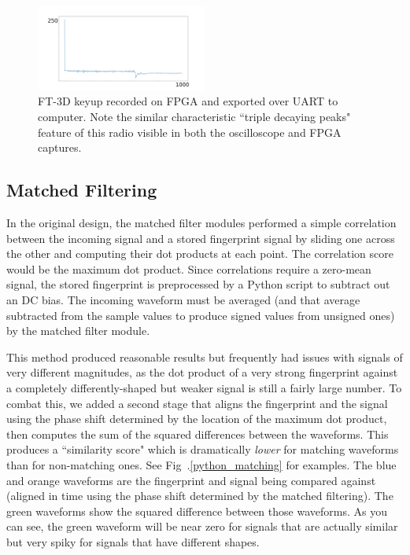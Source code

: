 \documentclass[conference]{IEEEtran}
\begin{document}
\begin{figure}
    \centerline{\includegraphics[width=0.5\textwidth]{First_Working_Capture_FPGA.png}}
    \caption{FT-3D keyup recorded on FPGA and exported over UART to computer. Note the similar characteristic ``triple decaying peaks" feature of this radio visible in both the oscilloscope and FPGA captures.}
    \label{keyup_fpga}
\end{figure}

\subsection{Matched Filtering}

In the original design, the matched filter modules performed a simple correlation between the incoming signal and a stored fingerprint signal by sliding one across the other and computing their dot products at each point. The correlation score would be the maximum dot product. Since correlations require a zero-mean signal, the stored fingerprint is preprocessed by a Python script to subtract out an DC bias. The incoming waveform must be averaged (and that average subtracted from the sample values to produce signed values from unsigned ones) by the matched filter module.

This method produced reasonable results but frequently had issues with signals of very different magnitudes, as the dot product of a very strong fingerprint against a completely differently-shaped but weaker signal is still a fairly large number. To combat this, we added a second stage that aligns the fingerprint and the signal using the phase shift determined by the location of the maximum dot product, then computes the sum of the squared differences between the waveforms. This produces a ``similarity score" which is dramatically \emph{lower} for matching waveforms than for non-matching ones. See Fig~.\ref{python_matching} for examples. The blue and orange waveforms are the fingerprint and signal being compared against (aligned in time using the phase shift determined by the matched filtering). The green waveforms show the squared difference between those waveforms. As you can see, the green waveform will be near zero for signals that are actually similar but very spiky for signals that have different shapes.
\end{document}
